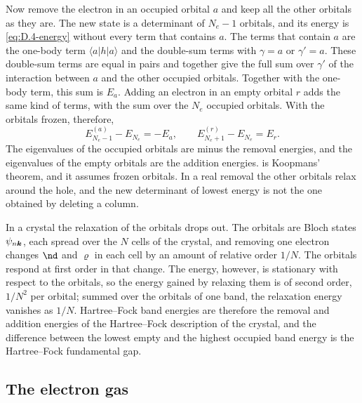Now remove the electron in an occupied orbital $a$ and keep all the other orbitals as they are. The new state is a determinant of $N_e - 1$ orbitals, and its energy is \cref{eq:D.4-energy} without every term that contains $a$. The terms that contain $a$ are the one-body term $\langle a|h|a\rangle$ and the double-sum terms with $\gamma = a$ or $\gamma' = a$. These double-sum terms are equal in pairs and together give the full sum over $\gamma'$ of the interaction between $a$ and the other occupied orbitals. Together with the one-body term, this sum is $E_a$. Adding an electron in an empty orbital $r$ adds the same kind of terms, with the sum over the $N_e$ occupied orbitals. With the orbitals frozen, therefore,
\begin{equation}
  E_{N_e-1}^{(a)} - E_{N_e} = -E_a, \qquad E_{N_e+1}^{(r)} - E_{N_e} = E_r .
  \label{eq:D.4-koopmans}
\end{equation}
The eigenvalues of the occupied orbitals are minus the removal energies, and the eigenvalues of the empty orbitals are the addition energies.  is Koopmans' theorem, and it assumes frozen orbitals. In a real removal the other orbitals relax around the hole, and the new determinant of lowest energy is not the one obtained by deleting a column.

In a crystal the relaxation of the orbitals drops out. The orbitals are Bloch states $\psi_{n\bm{k}}$, each spread over the $N$ cells of the crystal, and removing one electron changes $\nd$ and $\varrho$ in each cell by an amount of relative order $1/N$. The orbitals respond at first order in that change. The energy, however, is stationary with respect to the orbitals, so the energy gained by relaxing them is of second order, $1/N^2$ per orbital; summed over the orbitals of one band, the relaxation energy vanishes as $1/N$. Hartree--Fock band energies are therefore the removal and addition energies of the Hartree--Fock description of the crystal, and the difference between the lowest empty and the highest occupied band energy is the Hartree--Fock fundamental gap.

\subsection{The electron gas}


